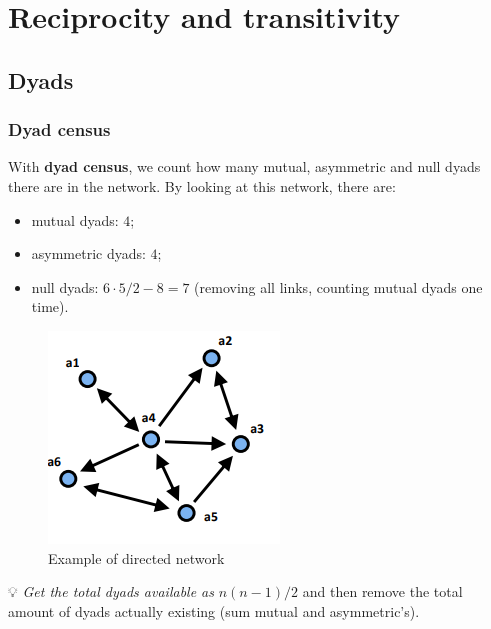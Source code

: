 \documentclass[
  notitlepage,
  onecolumn,
  openany]{book}
\providecommand{\tightlist}{%
  \setlength{\itemsep}{0pt}\setlength{\parskip}{0pt}}
\begin{document}
\hypertarget{reciprocity-and-transitivity}{%
\chapter{Reciprocity and transitivity}\label{reciprocity-and-transitivity}}

\hypertarget{dyads}{%
\section{Dyads}\label{dyads}}

\hypertarget{dyad-census}{%
\subsection{Dyad census}\label{dyad-census}}

With \textbf{dyad census}, we count how many mutual, asymmetric and null dyads there are in the network. By looking at this network, there are:

\begin{itemize}
\tightlist
\item
  mutual dyads: \(4\);
\item
  asymmetric dyads: \(4\);
\item
  null dyads: \(6\cdot 5/2 - 8 = 7\) (removing all links, counting mutual dyads one time).
\end{itemize}

\begin{figure}[h!]

{\centering \includegraphics[width=0.5\linewidth]{images/12-Reciprocity and transitivity/Untitled} 

}

\caption{Example of directed network}\label{fig:unnamed-chunk-98}
\end{figure}

💡 \emph{Get the total dyads available as} \(n(n-1)/2\) and then remove the total amount of dyads actually existing (sum mutual and asymmetric's).
\end{document}
